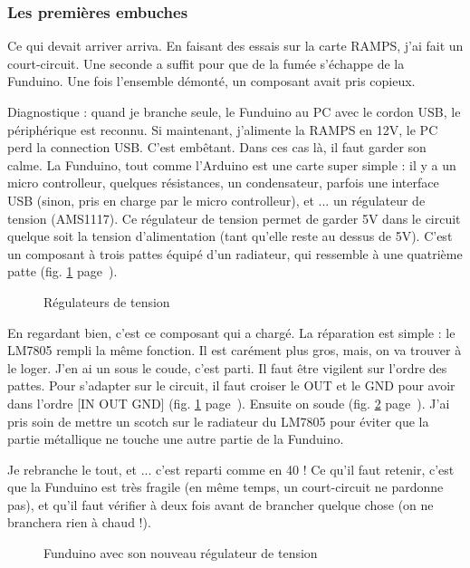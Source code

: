 \subsubsection{Les premières embuches}
Ce qui devait arriver arriva. En faisant des essais sur la carte RAMPS, j'ai fait un %
court-circuit. Une seconde a suffit pour que de la fumée s'échappe de la Funduino. Une %
fois l'ensemble démonté, un composant avait pris copieux. \par %
Diagnostique : quand je branche seule, le Funduino au PC avec le cordon USB, le %
périphérique est reconnu. Si maintenant, j'alimente la RAMPS en 12V, le PC perd la %
connection USB. C'est embêtant. Dans ces cas là, il faut garder son calme. La %
Funduino, tout comme l'Arduino est une carte super simple : il y a un micro controlleur, %
quelques résistances, un condensateur, parfois une interface USB (sinon, pris en charge %
par le micro controlleur), et ... un régulateur de tension (AMS1117). Ce régulateur de %
tension permet de garder 5V dans le circuit quelque soit la tension d'alimentation (tant %
qu'elle reste au dessus de 5V). C'est un composant à trois pattes équipé d'un radiateur, qui %
ressemble à une quatrième patte (fig. \ref{regulator} page~\pageref{regulator}). %
\begin{figure}%
   \caption{\label{regulator} Régulateurs de tension}%
\end{figure}%
En regardant bien, c'est ce composant qui a chargé. %
La réparation est simple : le LM7805 rempli la même fonction. Il est carément plus gros, %
mais, on va trouver à le loger. J'en ai un sous le coude, c'est parti. Il faut être %
vigilent sur l'ordre des pattes. Pour s'adapter sur le circuit, il faut croiser le OUT %
et le GND pour avoir dans l'ordre [IN OUT GND] (fig. \ref{regulator} page~\pageref{regulator}). Ensuite on soude (fig. \ref{funduino_repared} %
page~\pageref{funduino_repared}). J'ai pris soin de mettre un scotch sur le radiateur du %
LM7805 pour éviter que la partie métallique ne touche une autre partie de la Funduino.\par{} %
Je rebranche le tout, et ... c'est reparti comme en 40 ! Ce qu'il faut retenir, c'est %
que la Funduino est très fragile (en même temps, un court-circuit ne pardonne pas), %
et qu'il faut vérifier à deux fois avant de brancher quelque chose (on ne branchera %
rien à chaud !).%
\begin{figure}%
   \caption{\label{funduino_repared} Funduino avec son nouveau régulateur de tension}%
\end{figure}%
